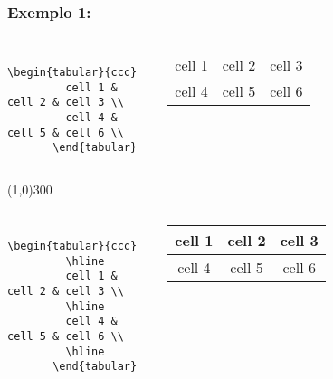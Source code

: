 \begin{frame}[fragile]
  \frametitle{Exemplo 1:}

  \begin{columns}
    \begin{column}[c]{5cm}
      \begin{verbatim}
       \begin{tabular}{ccc}
         cell 1 & cell 2 & cell 3 \\
         cell 4 & cell 5 & cell 6 \\
       \end{tabular}
     \end{verbatim}

    \end{column}
      \begin{tabular}{ccc}
        cell 1 & cell 2 & cell 3 \\
        cell 4 & cell 5 & cell 6 \\
      \end{tabular}
    \begin{column}[c]{2cm}

    \end{column}
  \end{columns}

  \vspace{10pt}
  \line(1,0){300}

  \begin{columns}[Código]
    \begin{column}[c]{5cm}
      \begin{verbatim}
       \begin{tabular}{ccc}
         \hline
         cell 1 & cell 2 & cell 3 \\
         \hline
         cell 4 & cell 5 & cell 6 \\
         \hline
       \end{tabular}
     \end{verbatim}

    \end{column}
      \begin{tabular}{ccc}
        \hline
        cell 1 & cell 2 & cell 3 \\
        \hline
        cell 4 & cell 5 & cell 6 \\
        \hline
      \end{tabular}
    \begin{column}[c]{2cm}

    \end{column}
  \end{columns}
\end{frame}

